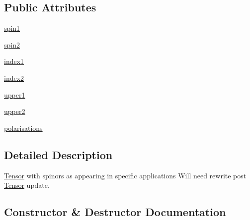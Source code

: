 \subsection*{Public Attributes}
\begin{DoxyCompactItemize}
\item 
\hyperlink{class_py_spinor_1_1_spinor_tensor_1_1_spinor_tensor_ac758bf30544b7f155fec43057a87df83}{spin1}
\item 
\hyperlink{class_py_spinor_1_1_spinor_tensor_1_1_spinor_tensor_a9d26b8b1a6971bb1529817fa1a93b10c}{spin2}
\item 
\hyperlink{class_py_spinor_1_1_spinor_tensor_1_1_spinor_tensor_ae258d4d0282e027e8585220aaaa477e2}{index1}
\item 
\hyperlink{class_py_spinor_1_1_spinor_tensor_1_1_spinor_tensor_af96dc3871eedd2d62f26f31188fba05a}{index2}
\item 
\hyperlink{class_py_spinor_1_1_spinor_tensor_1_1_spinor_tensor_a3a080c0f125b49a6bff5225fabbf7139}{upper1}
\item 
\hyperlink{class_py_spinor_1_1_spinor_tensor_1_1_spinor_tensor_a50ca2a0d08e4a54d50ed76a5d0ab3e95}{upper2}
\item 
\hyperlink{class_py_spinor_1_1_spinor_tensor_1_1_spinor_tensor_af75ee8d08e8afa5b1449a945adc6496f}{polarisations}
\end{DoxyCompactItemize}


\subsection{Detailed Description}
\hyperlink{namespace_py_spinor_1_1_tensor}{Tensor} with spinors as appearing in specific applications Will need rewrite post \hyperlink{namespace_py_spinor_1_1_tensor}{Tensor} update. 

\subsection{Constructor \& Destructor Documentation}
\hypertarget{class_py_spinor_1_1_spinor_tensor_1_1_spinor_tensor_ad1bfc424fc8b77321c2d0514c5645423}{}

